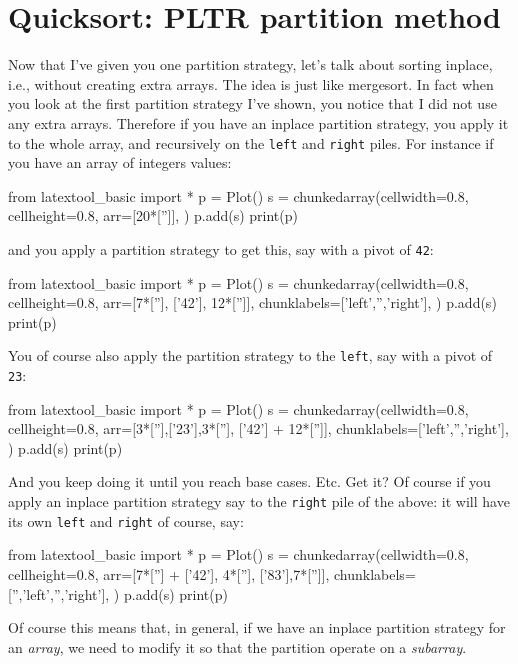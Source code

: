 \section{Quicksort: PLTR partition method}

Now that I've given you one partition strategy, let's talk about
sorting inplace, 
i.e., without creating extra arrays.
The idea is just like mergesort.
In fact when you look at the first partition strategy I've shown,
you notice that I did not use any extra arrays.
Therefore if you have an inplace partition strategy, you apply it to
the whole array, and recursively on the \verb!left! and \verb!right! piles.
For instance if you have an array of integers values:
\begin{python}
from latextool_basic import *
p = Plot()
s = chunkedarray(cellwidth=0.8, 
                 cellheight=0.8,
                 arr=[20*['']],
                )
p.add(s)
print(p)
\end{python}
and you apply a partition strategy to get this, say with a pivot of 
\verb!42!:
\begin{python}
from latextool_basic import *
p = Plot()
s = chunkedarray(cellwidth=0.8,
                 cellheight=0.8,
                 arr=[7*[''], ['42'], 12*['']],
                 chunklabels=['left','','right'],
)
p.add(s)
print(p)
\end{python}

You of course also apply the partition strategy to the \verb!left!,
say with a pivot of \verb!23!:
\begin{python}
from latextool_basic import *
p = Plot()
s = chunkedarray(cellwidth=0.8,
                   cellheight=0.8,
                   arr=[3*[''],['23'],3*[''], ['42'] + 12*['']],
                   chunklabels=['left','','right'],
)
p.add(s)
print(p)
\end{python}
And you keep doing it until you reach base cases.
Etc.
Get it?
Of course if you apply an inplace partition strategy say to the \verb!right!
pile of the above:
it will have its own \verb!left! and \verb!right! of course, say:
\begin{python}
from latextool_basic import *
p = Plot()
s = chunkedarray(cellwidth=0.8,
                   cellheight=0.8,
                   arr=[7*[''] + ['42'], 4*[''], ['83'],7*['']],
                   chunklabels=['','left','','right'],
)
p.add(s)
print(p)
\end{python}

Of course this means that, in general, if we have an 
inplace partition strategy for an \textit{array}, we need to modify it so that
the partition operate on a \textit{subarray}.


